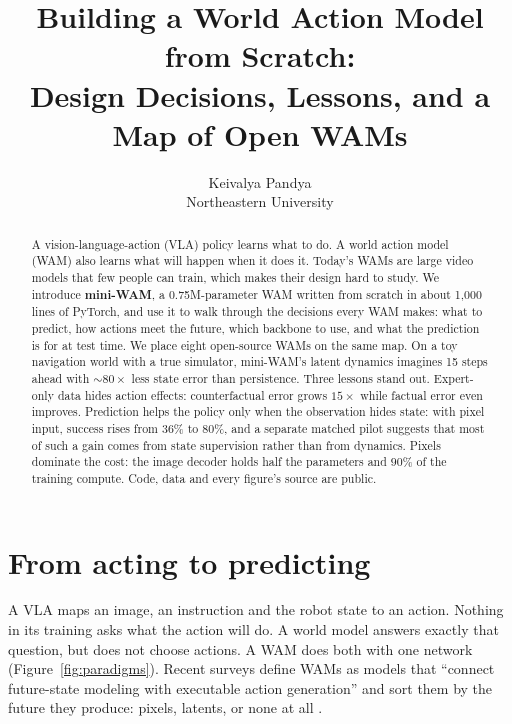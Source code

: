 \documentclass[11pt]{article}
\title{Building a World Action Model from Scratch:\\Design Decisions, Lessons, and a Map of Open WAMs}
\author{Keivalya Pandya\\Northeastern University}
\date{}
\begin{document}
\maketitle

\begin{abstract}
A vision-language-action (VLA) policy learns what to do. A world action model (WAM) also learns what will happen when it does it. Today's WAMs are large video models that few people can train, which makes their design hard to study. We introduce \textbf{mini-WAM}, a 0.75M-parameter WAM written from scratch in about 1,000 lines of PyTorch, and use it to walk through the decisions every WAM makes: what to predict, how actions meet the future, which backbone to use, and what the prediction is for at test time. We place eight open-source WAMs on the same map. On a toy navigation world with a true simulator, mini-WAM's latent dynamics imagines 15 steps ahead with ${\sim}80\times$ less state error than persistence. Three lessons stand out. Expert-only data hides action effects: counterfactual error grows $15\times$ while factual error even improves. Prediction helps the policy only when the observation hides state: with pixel input, success rises from 36\% to 80\%, and a separate matched pilot suggests that most of such a gain comes from state supervision rather than from dynamics. Pixels dominate the cost: the image decoder holds half the parameters and $90\%$ of the training compute. Code, data and every figure's source are public.
\end{abstract}

\section{From acting to predicting}

A VLA maps an image, an instruction and the robot state to an action. Nothing in its training asks what the action will do. A world model answers exactly that question, but does not choose actions. A WAM does both with one network (Figure~\ref{fig:paradigms}). Recent surveys define WAMs as models that ``connect future-state modeling with executable action generation'' \citep{lu2026survey} and sort them by the future they produce: pixels, latents, or none at all \citep{shen2026survey}.
\end{document}
